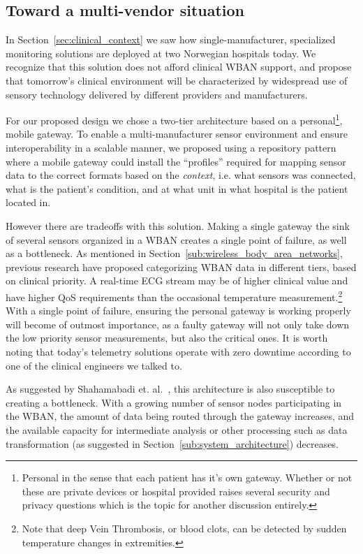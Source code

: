 \subsection{Toward a multi-vendor situation} %
\label{sub:toward_a_multi_vendor_situation}

In Section~\ref{sec:clinical_context} we saw how single-manufacturer, specialized monitoring solutions are deployed at two Norwegian hospitals today. We recognize that this solution does not afford clinical WBAN support, and propose that tomorrow's clinical environment will be characterized by widespread use of sensory technology delivered by different providers and manufacturers.

For our proposed design we chose a two-tier architecture based on a personal\footnote{ Personal in the sense that each patient has it's own gateway. Whether or not these are private devices or hospital provided raises several security and privacy questions which is the topic for another discussion entirely.}, mobile gateway. To enable a multi-manufacturer sensor environment and ensure interoperability in a scalable manner, we proposed using a repository pattern where a mobile gateway could install the ``profiles'' required for mapping sensor data to the correct formats based on the \emph{context}, i.e. what sensors was connected, what is the patient's condition, and at what unit in what hospital is the patient located in. 

However there are tradeoffs with this solution. Making a single gateway the sink of several sensors organized in a WBAN creates a single point of failure, as well as a bottleneck. As mentioned in Section~\ref{sub:wireless_body_area_networks}, previous research have proposed categorizing WBAN data in different tiers, based on clinical priority. A real-time ECG stream may be of higher clinical value and have higher QoS requirements than the occasional temperature measurement.\footnote{ Note that deep Vein Thrombosis, or blood clots, can be detected by sudden temperature changes in extremities.} With a single point of failure, ensuring the personal gateway is working properly will become of outmost importance, as a faulty gateway will not only take down the low priority sensor measurements, but also the critical ones. It is worth noting that today's telemetry solutions operate with zero downtime according to one of the clinical engineers we talked to.

As suggested by Shahamabadi et. al.~\cite{Shahamabadi:2013df}, this architecture is also susceptible to creating a bottleneck. With a growing number of sensor nodes participating in the WBAN, the amount of data being routed through the gateway increases, and the available capacity for intermediate analysis or other processing such as data transformation (as suggested in Section~\ref{sub:system_architecture}) decreases. 

